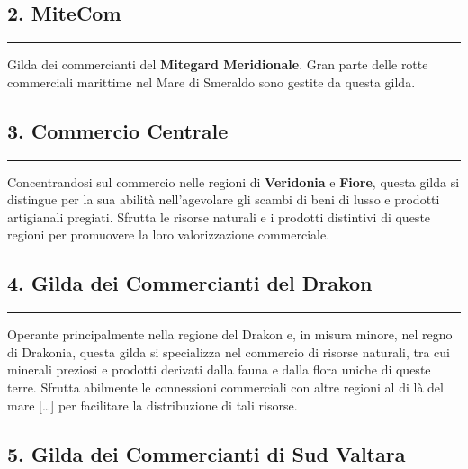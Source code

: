 \subsection{2. MiteCom}\label{mitecom}

\begin{center}\rule{0.5\linewidth}{0.5pt}\end{center}

Gilda dei commercianti del \textbf{Mitegard Meridionale}. Gran parte
delle rotte commerciali marittime nel Mare di Smeraldo sono gestite da
questa gilda.

\subsection{3. Commercio Centrale}\label{commercio-centrale}

\begin{center}\rule{0.5\linewidth}{0.5pt}\end{center}

Concentrandosi sul commercio nelle regioni di \textbf{Veridonia} e
\textbf{Fiore}, questa gilda si distingue per la sua abilità
nell'agevolare gli scambi di beni di lusso e prodotti artigianali
pregiati. Sfrutta le risorse naturali e i prodotti distintivi di queste
regioni per promuovere la loro valorizzazione commerciale.

\subsection{4. Gilda dei Commercianti del
Drakon}\label{gilda-dei-commercianti-del-drakon}

\begin{center}\rule{0.5\linewidth}{0.5pt}\end{center}

Operante principalmente nella regione del Drakon e, in misura minore,
nel regno di Drakonia, questa gilda si specializza nel commercio di
risorse naturali, tra cui minerali preziosi e prodotti derivati dalla
fauna e dalla flora uniche di queste terre. Sfrutta abilmente le
connessioni commerciali con altre regioni al di là del mare {[}\ldots{]}
per facilitare la distribuzione di tali risorse.

\subsection{5. Gilda dei Commercianti di Sud
Valtara}\label{gilda-dei-commercianti-di-sud-valtara}

